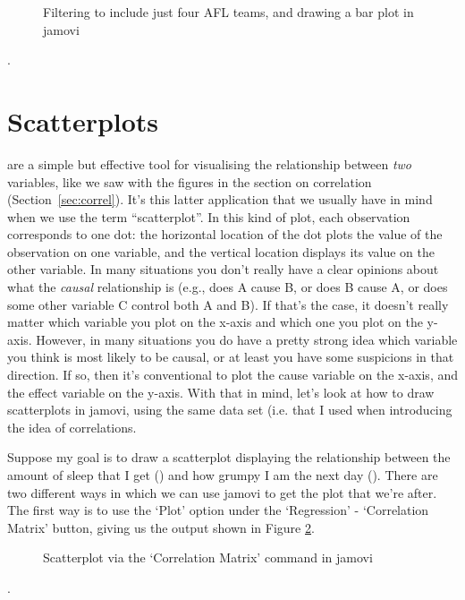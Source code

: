 \begin{figure}[ht]
\begin{center}
\caption{Filtering to include just four AFL teams, and drawing a bar plot in jamovi}
\label{fig:bar1}
\HR
\end{center}
\end{figure}. 


\section{Scatterplots\label{sec:scatterplots}}

 are a simple but effective tool for visualising the relationship between {\it two} variables, like we saw with the figures in the section on correlation (Section~\ref{sec:correl}). It's this latter application that we usually have in mind when we use the term ``scatterplot''. In this kind of plot, each observation corresponds to one dot: the horizontal location of the dot plots the value of the observation on one variable, and the vertical location displays its value on the other variable. In many situations you don't really have a clear opinions about what the {\it causal} relationship is (e.g., does A cause B, or does B cause A, or does some other variable C control both A and B). If that's the case, it doesn't really matter which variable you plot on the x-axis and which one you plot on the y-axis. However, in many situations you do have a pretty strong idea which variable you think is most likely to be causal, or at least you have some suspicions in that direction. If so, then it's conventional to plot the cause variable on the x-axis, and the effect variable on the y-axis. With that in mind, let's look at how to draw scatterplots in jamovi, using the same  data set (i.e.  that I used when introducing the idea of correlations.

Suppose my goal is to draw a scatterplot displaying the relationship between the amount of sleep that I get () and how grumpy I am the next day (). There are two different ways in which we can use jamovi to get the plot that we're after. The first way is to use the `Plot' option under the `Regression' - `Correlation Matrix' button, giving us the output shown in Figure \ref{fig:scatterplot1}.

\begin{figure}[t!!]
\begin{center}
\caption{Scatterplot via the `Correlation Matrix' command in jamovi}
\label{fig:scatterplot1}
\HR
\end{center}
\end{figure}. 


